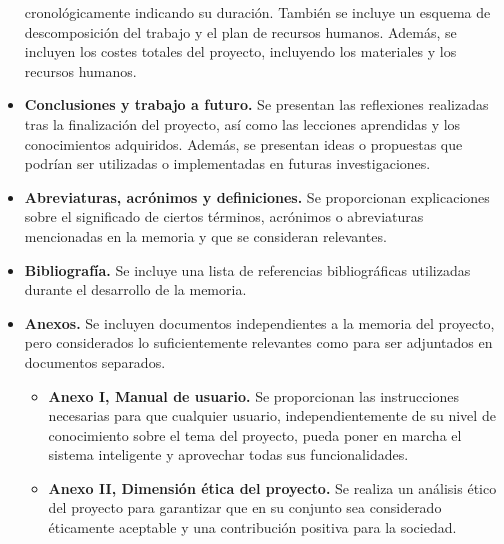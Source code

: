 \begin{itemize}
    cronológicamente indicando su duración. También se incluye un esquema de descomposición 
    del trabajo y el plan de recursos humanos. Además, se incluyen los costes totales del proyecto, 
    incluyendo los materiales y los recursos humanos.
    \item \textbf{Conclusiones y trabajo a futuro.} Se presentan las reflexiones realizadas 
    tras la finalización del proyecto, así como las lecciones aprendidas y los conocimientos 
    adquiridos. Además, se presentan ideas o propuestas que podrían ser utilizadas o implementadas 
    en futuras investigaciones.
    \item \textbf{Abreviaturas, acrónimos y definiciones.} Se proporcionan explicaciones sobre 
    el significado de ciertos términos, acrónimos o abreviaturas mencionadas en la memoria y 
    que se consideran relevantes.
    \item \textbf{Bibliografía.} Se incluye una lista de referencias bibliográficas utilizadas
    durante el desarrollo de la memoria.
    \item \textbf{Anexos.} Se incluyen documentos independientes a la memoria del proyecto, 
    pero considerados lo suficientemente relevantes como para ser adjuntados en documentos separados.
    \begin{itemize}
        \item \textbf{Anexo I, Manual de usuario.} Se proporcionan las instrucciones necesarias 
        para que cualquier usuario, independientemente de su nivel de conocimiento sobre el tema 
        del proyecto, pueda poner en marcha el sistema inteligente y aprovechar todas sus funcionalidades.
        \item \textbf{Anexo II, Dimensión ética del proyecto.} Se realiza un análisis ético del proyecto 
        para garantizar que en su conjunto sea considerado éticamente aceptable y una contribución positiva 
        para la sociedad.
    \end{itemize}

\end{itemize}



\pagebreak